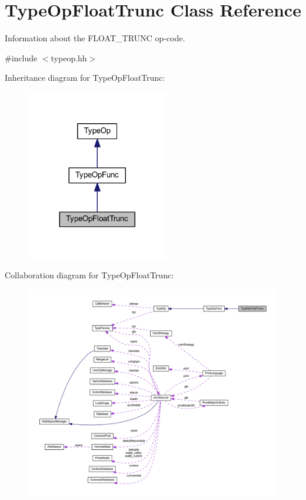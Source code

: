 \hypertarget{class_type_op_float_trunc}{}\section{Type\+Op\+Float\+Trunc Class Reference}
\label{class_type_op_float_trunc}


Information about the F\+L\+O\+A\+T\+\_\+\+T\+R\+U\+NC op-\/code.  




{\ttfamily \#include $<$typeop.\+hh$>$}



Inheritance diagram for Type\+Op\+Float\+Trunc\+:
\nopagebreak
\begin{figure}[H]
\begin{center}
\leavevmode
\includegraphics[width=176pt]{class_type_op_float_trunc__inherit__graph}
\end{center}
\end{figure}


Collaboration diagram for Type\+Op\+Float\+Trunc\+:
\nopagebreak
\begin{figure}[H]
\begin{center}
\leavevmode
\includegraphics[width=350pt]{class_type_op_float_trunc__coll__graph}
\end{center}
\end{figure}
